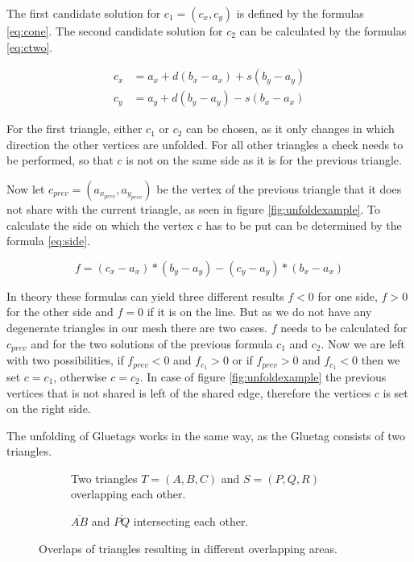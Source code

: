 \documentclass[draft,final]{vutinfth} %
\begin{document}
The first candidate solution for $c_1 = (c_x, c_y)$ is defined by the formulas \ref{eq:cone}. The second candidate solution for $c_2$ can be calculated by the formulas \ref{eq:ctwo}. 

\begin{equation}
\label{eq:ctwo}
\begin{split}
c_x &= a_x + d(b_x - a_x) + s(b_y - a_y)\\
c_y &= a_y + d(b_y - a_y) - s(b_x - a_x)
\end{split}
\end{equation}

For the first triangle, either $c_1$ or $c_2$ can be chosen, as it only changes in which direction the other vertices are unfolded. For all other triangles a check needs to be performed, so that $c$ is not on the same side as it is for the previous triangle.

Now let $c_{prev} = (a_{x_{prev}},a_{y_{prev}})$ be the vertex of the previous triangle that it does not share with the current triangle, as seen in figure \ref{fig:unfoldexample}. To calculate the side on which the vertex $c$ has to be put can be determined by the formula \ref{eq:side}.

\begin{equation}
\label{eq:side}
f = (c_x - a_x) * (b_y - a_y) - (c_y - a_y) * (b_x - a_x)
\end{equation}

In theory these formulas can yield three different results $f < 0$ for one side, $f > 0$ for the other side and $f = 0$ if it is on the line. But as we do not have any degenerate triangles in our mesh there are two cases. $f$ needs to be calculated for $c_{prev}$ and for the two solutions of the previous formula $c_1$ and $c_2$. Now we are left with two possibilities, if $f_{prev} < 0$ and $f_{c_1} > 0$ or if $f_{prev} > 0$ and $f_{c_1} < 0$ then we set $c = c_1$, otherwise $c = c_2$. In case of figure \ref{fig:unfoldexample} the previous vertices that is not shared is left of the shared edge, therefore the vertices $c$ is set on the right side.

The unfolding of Gluetags works in the same way, as the Gluetag consists of two triangles.

\begin{figure}
\centering
\begin{subfigure}[t]{.4\textwidth}
	
  \caption{Two triangles $T = (A,B,C)$ and $S = (P,Q,R)$ overlapping each other.}
	\label{fig:figtrioverlap}
\end{subfigure}%
\hspace{.1\textwidth}
\begin{subfigure}[t]{.4\textwidth}
	
	\caption{$\overline{AB}$ and $\overline{PQ}$ intersecting each other.}
	\label{fig:figlineintersection}
\end{subfigure}
\caption{Overlaps of triangles resulting in different overlapping areas.}
\label{fig:overlapexample}
\end{figure}
\end{document}
